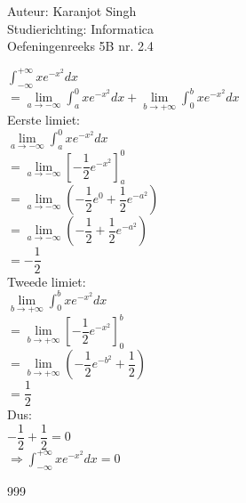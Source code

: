 \documentclass[a4paper]{article}
\newcommand{\dint}{\displaystyle\int}
\newcommand{\llim}{\lim\limits}
\begin{document}
\noindent \large Auteur: Karanjot Singh \\
\noindent \large Studierichting: Informatica \\
\noindent \large Oefeningenreeks 5B nr. 2.4 \\

\normalsize

$\dint_{-\infty}^{+\infty} xe^{-x^2} dx$ \\

$= \llim_{a \to -\infty} \dint_{a}^{0} xe^{-x^2} dx + \llim_{b \to +\infty} \dint_{0}^{b} xe^{-x^2} dx$ \\

Eerste limiet: \\

$\llim_{a \to -\infty} \dint_{a}^{0} xe^{-x^2} dx$ \\

$= \llim_{a \to -\infty} \left[ -\dfrac{1}{2} e^{-x^2} \right]_a^0$ \\

$= \llim_{a \to -\infty} \left( -\dfrac{1}{2} e^0 + \dfrac{1}{2} e^{-a^2} \right)$ \\

$= \llim_{a \to -\infty} \left( -\dfrac{1}{2} + \dfrac{1}{2} e^{-a^2} \right)$ \\

$= -\dfrac{1}{2}$ \\

Tweede limiet: \\

$\llim_{b \to +\infty} \dint_{0}^{b} xe^{-x^2} dx$ \\

$= \llim_{b \to +\infty} \left[ -\dfrac{1}{2} e^{-x^2} \right]_0^b$ \\

$= \llim_{b \to +\infty} \left( -\dfrac{1}{2} e^{-b^2} + \dfrac{1}{2} \right)$ \\

$= \dfrac{1}{2}$ \\

Dus: \\

$-\dfrac{1}{2} + \dfrac{1}{2} = 0$ \\

$\Rightarrow \dint_{-\infty}^{+\infty} xe^{-x^2} dx = 0$ \\

\begin{thebibliography}{999}
\end{thebibliography}
\end{document}
